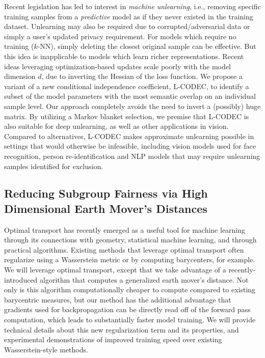 Recent legislation has
led to interest in {\em machine unlearning}, i.e., removing specific training samples from a {\em predictive} model as if they never existed in the training dataset. 
Unlearning may also be required due to  corrupted/adversarial data or simply a user's updated privacy requirement.
For models which require no training ($k$-NN), 
simply deleting the closest original sample can be effective. 
But this idea is inapplicable to models which learn richer 
representations.
Recent ideas leveraging optimization-based updates
scale poorly with the model dimension $d$,  
due to 
inverting the Hessian of the loss function. %
We propose
a variant of a new conditional independence coefficient, 
L-CODEC, to identify a subset of the model parameters with the most semantic overlap on an individual sample level. 
Our approach completely avoids the need to invert a (possibly) huge matrix. 
By utilizing a Markov blanket selection, 
we premise
that L-CODEC is also suitable for deep unlearning,
as well as other applications in vision.
Compared to alternatives, L-CODEC makes approximate unlearning possible 
in settings that would otherwise be infeasible, 
including vision models used for face recognition, 
person re-identification 
and NLP models that may require unlearning samples identified for exclusion.


\subsection{Reducing Subgroup Fairness via High Dimensional Earth Mover's Distances}

Optimal transport has recently emerged as a useful tool for machine learning through its connections with geometry, statistical machine learning, and through practical algorithms. Existing methods that leverage optimal transport often  regularize using  a Wasserstein metric or by computing barycenters, for example. %
We will leverage optimal transport, except that we take advantage of a recently-introduced algorithm that computes a generalized earth mover's distance.
Not only is this algorithm computationally cheaper to compute compared to existing barycentric measures, but our method has the additional  advantage that gradients used for backpropagation can be directly read off of the forward pass computation, which leads to substantially faster model training.
We will provide technical details about this new regularization term and its properties, 
and 
experimental demonstrations of improved training speed over existing Wasserstein-style methods.

